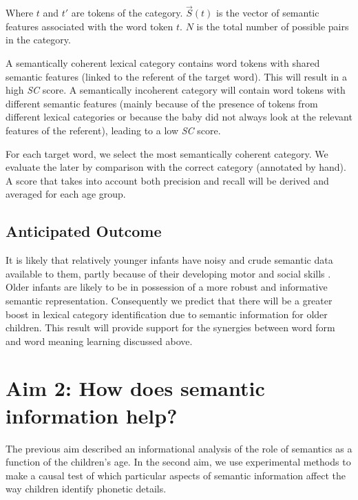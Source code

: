 \documentclass[12pt]{article}
\begin{document}
Where $t$ and $t'$ are tokens of the category.  $\vec{S}(t)$ is the vector of semantic features associated with the word token $t$. $N$ is the total number of possible pairs in the category.

A semantically coherent lexical category contains word tokens with shared semantic features (linked to the referent of the target word). This will result in a high \textit{SC} score.   A semantically incoherent category will contain word tokens with different semantic features (mainly because of the presence of tokens from different lexical categories or because the baby did not always look at the relevant features of the referent), leading to a low \textit{SC} score. 

For each target word, we select the most semantically coherent category.  We evaluate the later by comparison with the correct category (annotated by hand). A score that takes into account both precision and recall will be derived and averaged for each age group.

\subsection{Anticipated Outcome}

It is likely that relatively younger infants have noisy and crude semantic data available to them, partly because of their developing motor and social skills \cite{frank2013}.  Older infants are likely to be in possession of a more robust and informative semantic representation. Consequently we predict that there will be a greater boost in lexical category identification due to semantic information for older children. This result will provide support for the synergies between word form and word meaning learning discussed above.  

\section{Aim 2: How does semantic information help?}

The previous aim described an informational analysis of the role of semantics as a function of the children's age. In the second aim, we use experimental methods to make a causal test of which particular aspects of semantic information affect the way children identify phonetic details.
\end{document}
